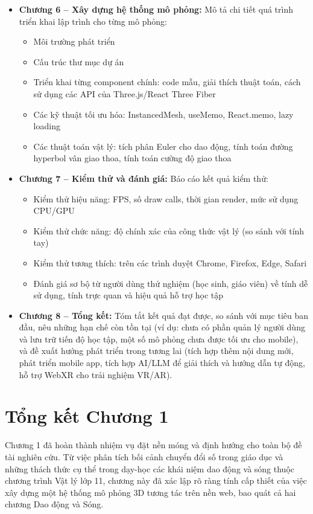\begin{itemize}
    \item \textbf{Chương 6 – Xây dựng hệ thống mô phỏng:} Mô tả chi tiết quá trình triển khai lập trình cho từng mô phỏng:
    \begin{itemize}
        \item Môi trường phát triển
        \item Cấu trúc thư mục dự án
        \item Triển khai từng component chính: code mẫu, giải thích thuật toán, cách sử dụng các API của Three.js/React Three Fiber
        \item Các kỹ thuật tối ưu hóa: InstancedMesh, useMemo, React.memo, lazy loading
        \item Các thuật toán vật lý: tích phân Euler cho dao động, tính toán đường hyperbol vân giao thoa, tính toán cường độ giao thoa
    \end{itemize}
    
    \item \textbf{Chương 7 – Kiểm thử và đánh giá:} Báo cáo kết quả kiểm thử:
    \begin{itemize}
        \item Kiểm thử hiệu năng: FPS, số draw calls, thời gian render, mức sử dụng CPU/GPU
        \item Kiểm thử chức năng: độ chính xác của công thức vật lý (so sánh với tính tay)
        \item Kiểm thử tương thích: trên các trình duyệt Chrome, Firefox, Edge, Safari
        \item Đánh giá sơ bộ từ người dùng thử nghiệm (học sinh, giáo viên) về tính dễ sử dụng, tính trực quan và hiệu quả hỗ trợ học tập
    \end{itemize}
    
    \item \textbf{Chương 8 – Tổng kết:} Tóm tắt kết quả đạt được, so sánh với mục tiêu ban đầu, nêu những hạn chế còn tồn tại (ví dụ: chưa có phần quản lý người dùng và lưu trữ tiến độ học tập, một số mô phỏng chưa được tối ưu cho mobile), và đề xuất hướng phát triển trong tương lai (tích hợp thêm nội dung mới, phát triển mobile app, tích hợp AI/LLM để giải thích và hướng dẫn tự động, hỗ trợ WebXR cho trải nghiệm VR/AR).
\end{itemize}

\section{Tổng kết Chương 1}
Chương 1 đã hoàn thành nhiệm vụ đặt nền móng và định hướng cho toàn bộ đề tài nghiên cứu. Từ việc phân tích bối cảnh chuyển đổi số trong giáo dục và những thách thức cụ thể trong dạy-học các khái niệm dao động và sóng thuộc chương trình Vật lý lớp 11, chương này đã xác lập rõ ràng tính cấp thiết của việc xây dựng một hệ thống mô phỏng 3D tương tác trên nền web, bao quát cả hai chương Dao động và Sóng.

